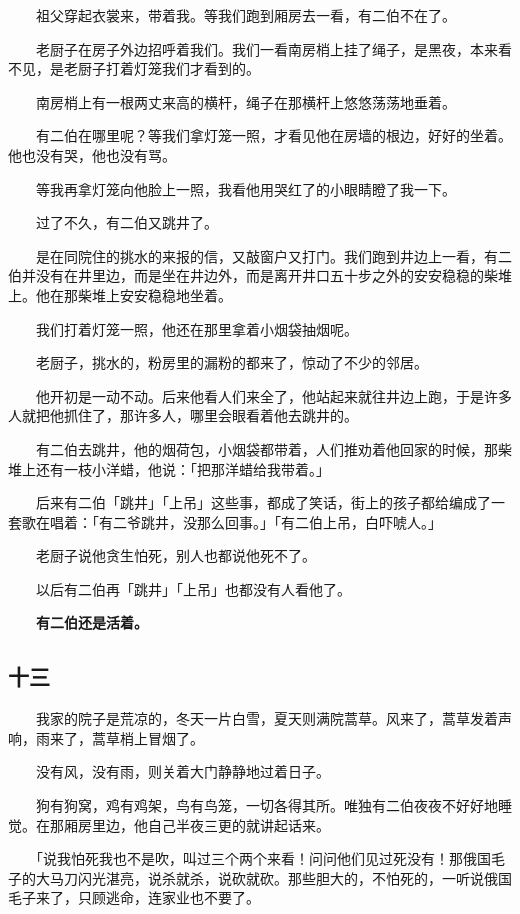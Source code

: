 \documentclass[UTF8]{ctexart}
\begin{document}
　　祖父穿起衣裳来，带着我。等我们跑到厢房去一看，有二伯不在了。

　　老厨子在房子外边招呼着我们。我们一看南房梢上挂了绳子，是黑夜，本来看不见，是老厨子打着灯笼我们才看到的。

　　南房梢上有一根两丈来高的横杆，绳子在那横杆上悠悠荡荡地垂着。

　　有二伯在哪里呢？等我们拿灯笼一照，才看见他在房墙的根边，好好的坐着。他也没有哭，他也没有骂。

　　等我再拿灯笼向他脸上一照，我看他用哭红了的小眼睛瞪了我一下。

　　过了不久，有二伯又跳井了。

　　是在同院住的挑水的来报的信，又敲窗户又打门。我们跑到井边上一看，有二伯并没有在井里边，而是坐在井边外，而是离开井口五十步之外的安安稳稳的柴堆上。他在那柴堆上安安稳稳地坐着。

　　我们打着灯笼一照，他还在那里拿着小烟袋抽烟呢。

　　老厨子，挑水的，粉房里的漏粉的都来了，惊动了不少的邻居。

　　他开初是一动不动。后来他看人们来全了，他站起来就往井边上跑，于是许多人就把他抓住了，那许多人，哪里会眼看着他去跳井的。

　　有二伯去跳井，他的烟荷包，小烟袋都带着，人们推劝着他回家的时候，那柴堆上还有一枝小洋蜡，他说：「把那洋蜡给我带着。」

　　后来有二伯「跳井」「上吊」这些事，都成了笑话，街上的孩子都给编成了一套歌在唱着：「有二爷跳井，没那么回事。」「有二伯上吊，白吓唬人。」

　　老厨子说他贪生怕死，别人也都说他死不了。

　　以后有二伯再「跳井」「上吊」也都没有人看他了。

　　\textbf{有二伯还是活着。}

\subsection{十三}

　　我家的院子是荒凉的，冬天一片白雪，夏天则满院蒿草。风来了，蒿草发着声响，雨来了，蒿草梢上冒烟了。

　　没有风，没有雨，则关着大门静静地过着日子。

　　狗有狗窝，鸡有鸡架，鸟有鸟笼，一切各得其所。唯独有二伯夜夜不好好地睡觉。在那厢房里边，他自己半夜三更的就讲起话来。

　　「说我怕死我也不是吹，叫过三个两个来看！问问他们见过死没有！那俄国毛子的大马刀闪光湛亮，说杀就杀，说砍就砍。那些胆大的，不怕死的，一听说俄国毛子来了，只顾逃命，连家业也不要了。
\end{document}
